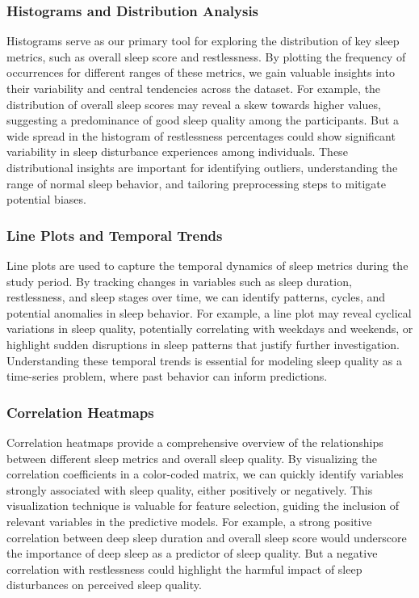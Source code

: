 \documentclass[10pt]{extarticle}
\begin{document}
\subsubsection{Histograms and Distribution Analysis}

Histograms serve as our primary tool for exploring the distribution of key sleep metrics, such as overall sleep score and restlessness. By plotting the frequency of occurrences for different ranges of these metrics, we gain valuable insights into their variability and central tendencies across the dataset. For example, the distribution of overall sleep scores may reveal a skew towards higher values, suggesting a predominance of good sleep quality among the participants. But a wide spread in the histogram of restlessness percentages could show significant variability in sleep disturbance experiences among individuals. These distributional insights are important for identifying outliers, understanding the range of normal sleep behavior, and tailoring preprocessing steps to mitigate potential biases.

\subsubsection{Line Plots and Temporal Trends}

Line plots are used to capture the temporal dynamics of sleep metrics during the study period. By tracking changes in variables such as sleep duration, restlessness, and sleep stages over time, we can identify patterns, cycles, and potential anomalies in sleep behavior. For example, a line plot may reveal cyclical variations in sleep quality, potentially correlating with weekdays and weekends, or highlight sudden disruptions in sleep patterns that justify further investigation. Understanding these temporal trends is essential for modeling sleep quality as a time-series problem, where past behavior can inform predictions.

\subsubsection{Correlation Heatmaps}

Correlation heatmaps provide a comprehensive overview of the relationships between different sleep metrics and overall sleep quality. By visualizing the correlation coefficients in a color-coded matrix, we can quickly identify variables strongly associated with sleep quality, either positively or negatively. This visualization technique is valuable for feature selection, guiding the inclusion of relevant variables in the predictive models. For example, a strong positive correlation between deep sleep duration and overall sleep score would underscore the importance of deep sleep as a predictor of sleep quality. But a negative correlation with restlessness could highlight the harmful impact of sleep disturbances on perceived sleep quality.
\end{document}

